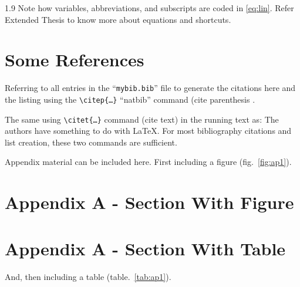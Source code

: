 \documentclass[ms-thesis,12pt,chapterrefs]{ndsu-thesis-2022}
\newcommand\myspacing{1.9} %
\begin{document}
\begin{spacing}{\myspacing}
Note how variables, abbreviations, and subscripts are coded in \cref{eq:lin}. Refer Extended Thesis to know more about equations and shortcuts. 

\section{Some References}
Referring to all entries in the ``\texttt{mybib.bib}'' file to generate the citations here and the listing using the \texttt{\textbackslash citep\{\ldots\}} ``natbib'' command (cite parenthesis \citep{texbook,lcompanion,latex2e,knuth1984,lesk1977,amsthm2017,calvo2004using,cannayen2011latex,kopka2004guide,notso2021,bari2016identification}.

The same using \texttt{\textbackslash citet\{\ldots\}} command (cite text) in the running text as: The authors \citet{texbook,lcompanion,latex2e,knuth1984,lesk1977,amsthm2017,calvo2004using,cannayen2011latex,kopka2004guide,notso2021,bari2016identification} have something to do with \LaTeX. For most bibliography citations and list creation, these two commands are sufficient.

\makerefs %


Appendix material can be included here. First including a figure (fig.~\ref{fig:ap1}).

\section{Appendix A - Section With Figure}
	\kant[8]

\section{Appendix A - Section With Table}
And, then including a table (table.~\ref{tab:ap1}).


\end{spacing}
\end{document}
